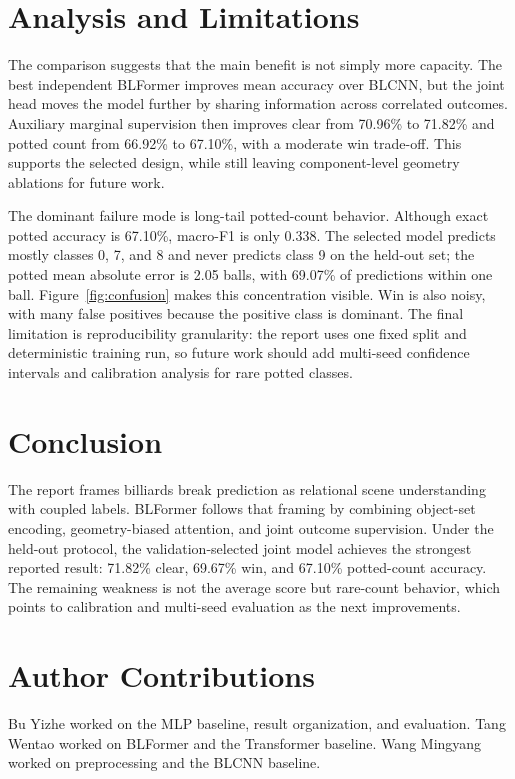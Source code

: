 \documentclass[12pt]{article}
\begin{document}
\section{Analysis and Limitations}
The comparison suggests that the main benefit is not simply more capacity.  The best independent BLFormer improves mean accuracy over BLCNN, but the joint head moves the model further by sharing information across correlated outcomes.  Auxiliary marginal supervision then improves clear from 70.96\% to 71.82\% and potted count from 66.92\% to 67.10\%, with a moderate win trade-off.  This supports the selected design, while still leaving component-level geometry ablations for future work.

The dominant failure mode is long-tail potted-count behavior.  Although exact potted accuracy is 67.10\%, macro-F1 is only 0.338.  The selected model predicts mostly classes 0, 7, and 8 and never predicts class 9 on the held-out set; the potted mean absolute error is 2.05 balls, with 69.07\% of predictions within one ball.  Figure~\ref{fig:confusion} makes this concentration visible.  Win is also noisy, with many false positives because the positive class is dominant.  The final limitation is reproducibility granularity: the report uses one fixed split and deterministic training run, so future work should add multi-seed confidence intervals and calibration analysis for rare potted classes.

\section{Conclusion}
The report frames billiards break prediction as relational scene understanding with coupled labels.  BLFormer follows that framing by combining object-set encoding, geometry-biased attention, and joint outcome supervision.  Under the held-out protocol, the validation-selected joint model achieves the strongest reported result: 71.82\% clear, 69.67\% win, and 67.10\% potted-count accuracy.  The remaining weakness is not the average score but rare-count behavior, which points to calibration and multi-seed evaluation as the next improvements.

\section{Author Contributions}
Bu Yizhe worked on the MLP baseline, result organization, and evaluation.  Tang Wentao worked on BLFormer and the Transformer baseline.  Wang Mingyang worked on preprocessing and the BLCNN baseline.
\end{document}
